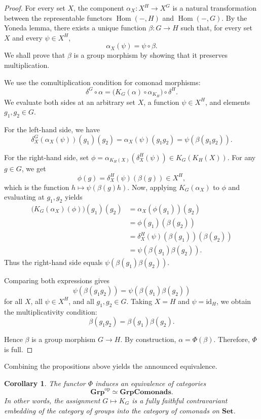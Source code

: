 \documentclass{amsart}
\newtheorem{corollary}{Corollary}
\begin{document}
\begin{proof}
For every set $X$, the component $\alpha_X \colon X^H \rightarrow X^G$ is a natural transformation between the representable functors $\operatorname{Hom}(-, H)$ and $\operatorname{Hom}(-, G)$. By the Yoneda lemma, there exists a unique function $\beta \colon G \rightarrow H$ such that, for every set $X$ and every $\psi \in X^H$,
\[
\alpha_X(\psi) = \psi \circ \beta.
\]
We shall prove that $\beta$ is a group morphism by showing that it preserves multiplication.

We use the comultiplication condition for comonad morphisms:
\[
\delta^G \circ \alpha = \bigl( K_G(\alpha) \circ \alpha_{K_H} \bigr) \circ \delta^H.
\]
We evaluate both sides at an arbitrary set $X$, a function $\psi \in X^H$, and elements $g_1, g_2 \in G$.

For the left-hand side, we have
\[
\delta^G_X(\alpha_X(\psi))(g_1)(g_2)
= \alpha_X(\psi)(g_1 g_2)
= \psi(\beta(g_1 g_2)).
\]

For the right-hand side, set $\phi = \alpha_{K_H(X)}(\delta^H_X(\psi)) \in K_G(K_H(X))$. 
For any $g \in G$, we get
\[
\phi(g) = \delta^H_X(\psi)(\beta(g)) \in X^H,
\]
which is the function $h \mapsto \psi(\beta(g) h)$. 
Now, applying $K_G(\alpha_X)$ to $\phi$ and evaluating at $g_1, g_2$ yields
\[
\begin{aligned}
\bigl(K_G(\alpha_X)(\phi)\bigr)(g_1)(g_2)
&= \alpha_X(\phi(g_1))(g_2) \\
&= \phi(g_1)(\beta(g_2)) \\
&= \delta^H_X(\psi)(\beta(g_1))(\beta(g_2)) \\
&= \psi(\beta(g_1)\beta(g_2)).
\end{aligned}
\]
Thus the right-hand side equals $\psi(\beta(g_1)\beta(g_2))$.

Comparing both expressions gives
\[
\psi(\beta(g_1 g_2)) = \psi(\beta(g_1)\beta(g_2))
\]
for all $X$, all $\psi \in X^H$, and all $g_1, g_2 \in G$. Taking $X = H$ and $\psi = \mathrm{id}_H$, we obtain the multiplicativity condition:
\[
\beta(g_1 g_2) = \beta(g_1)\beta(g_2). \tag{1}
\]

Hence $\beta$ is a group morphism $G \to H$. By construction, $\alpha = \Phi(\beta)$. Therefore, $\Phi$ is full.
\end{proof}

Combining the propositions above yields the announced equivalence.

\begin{corollary}\label{cor:full_embedding}
The functor $\Phi$ induces an equivalence of categories
\[
\mathbf{Grp}^{\mathrm{op}} \simeq \mathbf{GrpComonads}.
\]
In other words, the assignment $G \mapsto K_G$ is a fully faithful contravariant embedding of the category of groups into the category of comonads on $\mathbf{Set}$.
\end{corollary}
\end{document}
